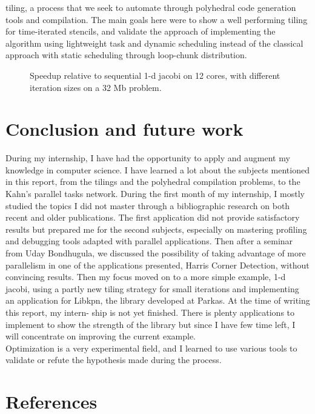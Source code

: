 \documentclass[a4paper,11pt]{article}
\begin{document}
tiling, a process that we seek to automate through polyhedral code generation tools and
compilation. The main goals here were to show a well performing tiling for time-iterated
stencils, and validate the approach of implementing the algorithm using lightweight task
and dynamic scheduling instead of the classical approach with static scheduling through
loop-chunk distribution.
\begin{figure}[h]
  \begin{center}
  
  \end{center}
 \caption{Speedup relative to sequential 1-d jacobi on 12 cores, with different iteration 
 sizes on a 32 Mb problem.}
 \label{results_hdiam_var}
\end{figure}

\section{Conclusion and future work}
During my internship, I have had the opportunity to apply and augment my knowledge
in computer science. I have learned a lot about the subjects mentioned in this report,
from the tilings and the polyhedral compilation problems, to the Kahn’s parallel tasks
network. During the first month of my internship, I mostly studied the topics I did not
master through a bibliographic research on both recent and older publications. The first
application did not provide satisfactory results but prepared me for the second subjects,
especially on mastering profiling and debugging tools adapted with parallel applications.
Then after a seminar from Uday Bondhugula, we discussed the possibility of taking advantage 
of more parallelism in one of the applications presented, Harris Corner Detection,
without convincing results. Then my focus moved on to a more simple example, 1-d jacobi,
using a partly new tiling strategy for small iterations and implementing an application for
Libkpn, the library developed at Parkas. At the time of writing this report, my intern-
ship is not yet finished. There is plenty applications to implement to show the strength
of the library but since I have few time left, I will concentrate on improving the current
example. \\
Optimization is a very experimental field, and I learned to use various tools to validate or
refute the hypothesis made during the process.

\newpage
\section{References}

\end{document}
